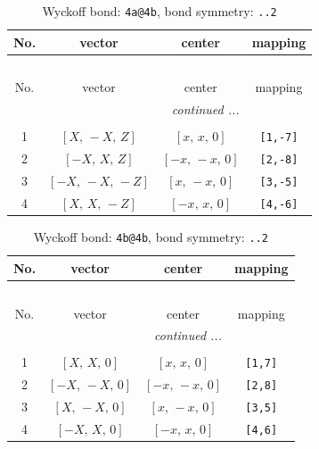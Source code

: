 \documentclass[fleqn,8pt]{jsarticle}
\begin{document}
\begin{longtable}{cccc}
\caption{Wyckoff bond: {\tt 4a@4b}, bond symmetry: {\tt ..2}}
 \\
 \hline \hline
No. & vector & center & mapping \\ \hline \endfirsthead

\multicolumn{3}{l}{\tablename\ \thetable{}} \\
 \hline \hline
No. & vector & center & mapping \\ \hline \endhead

 \hline \hline
\multicolumn{3}{r}{\footnotesize\it continued ...} \\ \endfoot

 \hline \hline
\multicolumn{3}{r}{} \\ \endlastfoot

1 & $\left[ X,\, - X,\, Z \right]$ & $\left[ x,\, x,\, 0 \right]$ & {\tt [1,-7]} \\ \hline
2 & $\left[ - X,\, X,\, Z \right]$ & $\left[ - x,\, - x,\, 0 \right]$ & {\tt [2,-8]} \\ \hline
3 & $\left[ - X,\, - X,\, - Z \right]$ & $\left[ x,\, - x,\, 0 \right]$ & {\tt [3,-5]} \\ \hline
4 & $\left[ X,\, X,\, - Z \right]$ & $\left[ - x,\, x,\, 0 \right]$ & {\tt [4,-6]} \\
\end{longtable}
\renewcommand{\arraystretch}{1.2}
\begin{longtable}{cccc}
\caption{Wyckoff bond: {\tt 4b@4b}, bond symmetry: {\tt ..2}}
 \\
 \hline \hline
No. & vector & center & mapping \\ \hline \endfirsthead

\multicolumn{3}{l}{\tablename\ \thetable{}} \\
 \hline \hline
No. & vector & center & mapping \\ \hline \endhead

 \hline \hline
\multicolumn{3}{r}{\footnotesize\it continued ...} \\ \endfoot

 \hline \hline
\multicolumn{3}{r}{} \\ \endlastfoot

1 & $\left[ X,\, X,\, 0 \right]$ & $\left[ x,\, x,\, 0 \right]$ & {\tt [1,7]} \\ \hline
2 & $\left[ - X,\, - X,\, 0 \right]$ & $\left[ - x,\, - x,\, 0 \right]$ & {\tt [2,8]} \\ \hline
3 & $\left[ X,\, - X,\, 0 \right]$ & $\left[ x,\, - x,\, 0 \right]$ & {\tt [3,5]} \\ \hline
4 & $\left[ - X,\, X,\, 0 \right]$ & $\left[ - x,\, x,\, 0 \right]$ & {\tt [4,6]} \\
\end{longtable}
\end{document}
